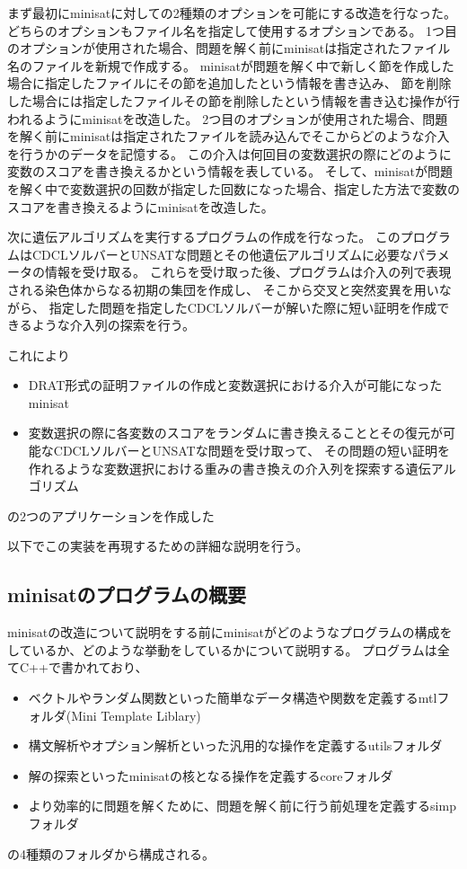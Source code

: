 \documentclass[titlepage]{jsarticle}
\begin{document}
まず最初にminisatに対しての2種類のオプションを可能にする改造を行なった。
どちらのオプションもファイル名を指定して使用するオプションである。
1つ目のオプションが使用された場合、問題を解く前にminisatは指定されたファイル名のファイルを新規で作成する。
minisatが問題を解く中で新しく節を作成した場合に指定したファイルにその節を追加したという情報を書き込み、
節を削除した場合には指定したファイルその節を削除したという情報を書き込む操作が行われるようにminisatを改造した。
2つ目のオプションが使用された場合、問題を解く前にminisatは指定されたファイルを読み込んでそこからどのような介入を行うかのデータを記憶する。
この介入は何回目の変数選択の際にどのように変数のスコアを書き換えるかという情報を表している。
そして、minisatが問題を解く中で変数選択の回数が指定した回数になった場合、指定した方法で変数のスコアを書き換えるようにminisatを改造した。

次に遺伝アルゴリズムを実行するプログラムの作成を行なった。
このプログラムはCDCLソルバーとUNSATな問題とその他遺伝アルゴリズムに必要なパラメータの情報を受け取る。
これらを受け取った後、プログラムは介入の列で表現される染色体からなる初期の集団を作成し、
そこから交叉と突然変異を用いながら、
指定した問題を指定したCDCLソルバーが解いた際に短い証明を作成できるような介入列の探索を行う。

これにより
\begin{itemize}
	\item DRAT形式の証明ファイルの作成と変数選択における介入が可能になったminisat
	\item 変数選択の際に各変数のスコアをランダムに書き換えることとその復元が可能なCDCLソルバーとUNSATな問題を受け取って、
	      その問題の短い証明を作れるような変数選択における重みの書き換えの介入列を探索する遺伝アルゴリズム
\end{itemize}
の2つのアプリケーションを作成した

以下でこの実装を再現するための詳細な説明を行う。





\subsection{minisatのプログラムの概要}



minisatの改造について説明をする前にminisatがどのようなプログラムの構成をしているか、どのような挙動をしているかについて説明する。
プログラムは全てC++で書かれており、
\begin{itemize}
	\item ベクトルやランダム関数といった簡単なデータ構造や関数を定義するmtlフォルダ(Mini Template Liblary)
	\item 構文解析やオプション解析といった汎用的な操作を定義するutilsフォルダ
	\item 解の探索といったminisatの核となる操作を定義するcoreフォルダ
	\item より効率的に問題を解くために、問題を解く前に行う前処理を定義するsimpフォルダ
\end{itemize}
の4種類のフォルダから構成される。
\end{document}
